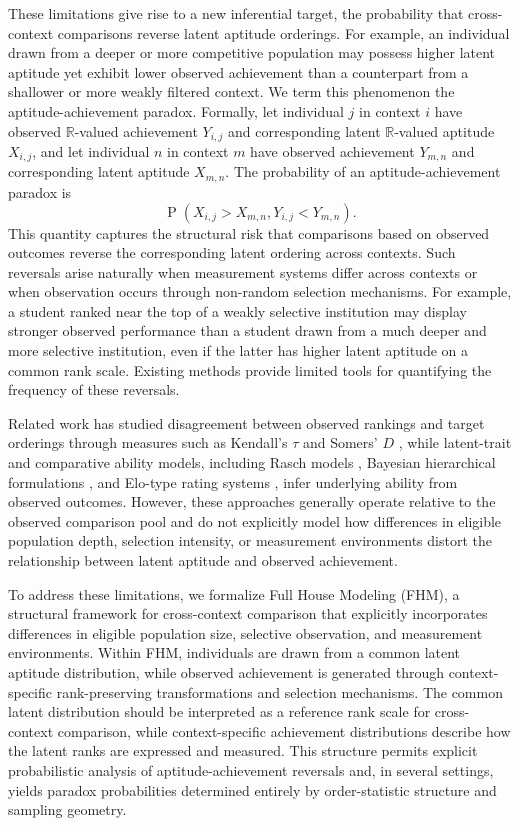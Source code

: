 \documentclass[12pt]{article}
\DeclareMathOperator*{\Prob}{P}
\begin{document}
These limitations give rise to a new inferential target, the probability that cross-context comparisons reverse latent aptitude orderings. For example, an individual drawn from a deeper or more competitive population may possess higher latent aptitude yet exhibit lower observed achievement than a counterpart from a shallower or more weakly filtered context. We term this phenomenon the aptitude-achievement paradox. Formally, let individual $j$ in context $i$ have observed $\mathbb{R}$-valued achievement $Y_{i,j}$ and corresponding latent $\mathbb{R}$-valued aptitude $X_{i,j}$, and let individual $n$ in context $m$ have observed achievement $Y_{m,n}$ and corresponding latent aptitude $X_{m,n}$. The probability of an aptitude-achievement paradox is
\begin{equation} \label{eq:paradoxgeneral}
	\Prob\left(X_{i,j} > X_{m,n}, Y_{i,j} < Y_{m,n}\right).
\end{equation}
This quantity captures the structural risk that comparisons based on observed outcomes reverse the corresponding latent ordering across contexts. Such reversals arise naturally when measurement systems differ across contexts or when observation occurs through non-random selection mechanisms. For example, a student ranked near the top of a weakly selective institution may display stronger observed performance than a student drawn from a much deeper and more selective institution, even if the latter has higher latent aptitude on a common rank scale. Existing methods provide limited tools for quantifying the frequency of these reversals.

Related work has studied disagreement between observed rankings and target orderings through measures such as Kendall's $\tau$ \citep{kendall1938new} and Somers' $D$ \citep{somers1962new}, while latent-trait and comparative ability models, including Rasch models \citep{bond2013applying}, Bayesian hierarchical formulations \citep{raudenbush1986hierarchical, BRL99}, and Elo-type rating systems \citep{elo1978rating, graepel2007bayesian}, infer underlying ability from observed outcomes. However, these approaches generally operate relative to the observed comparison pool and do not explicitly model how differences in eligible population depth, selection intensity, or measurement environments distort the relationship between latent aptitude and observed achievement.

To address these limitations, we formalize Full House Modeling (FHM), a structural framework for cross-context comparison that explicitly incorporates differences in eligible population size, selective observation, and measurement environments. Within FHM, individuals are drawn from a common latent aptitude distribution, while observed achievement is generated through context-specific rank-preserving transformations and selection mechanisms. The common latent distribution should be interpreted as a reference rank scale for cross-context comparison, while context-specific achievement distributions describe how the latent ranks are expressed and measured. This structure permits explicit probabilistic analysis of aptitude-achievement reversals and, in several settings, yields paradox probabilities determined entirely by order-statistic structure and sampling geometry.
\end{document}
